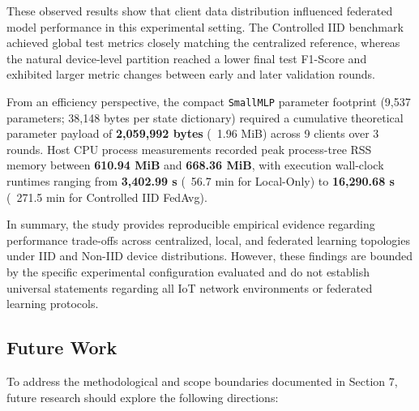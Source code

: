 \documentclass[11pt,a4paper]{article}
\begin{document}
These observed results show that client data distribution influenced federated model performance in this experimental setting. The Controlled IID benchmark achieved global test metrics closely matching the centralized reference, whereas the natural device-level partition reached a lower final test F1-Score and exhibited larger metric changes between early and later validation rounds.

From an efficiency perspective, the compact \texttt{SmallMLP} parameter footprint (9,537 parameters; 38,148 bytes per state dictionary) required a cumulative theoretical parameter payload of \textbf{2,059,992 bytes} (~1.96 MiB) across 9 clients over 3 rounds. Host CPU process measurements recorded peak process-tree RSS memory between \textbf{610.94 MiB} and \textbf{668.36 MiB}, with execution wall-clock runtimes ranging from \textbf{3,402.99 s} (~56.7 min for Local-Only) to \textbf{16,290.68 s} (~271.5 min for Controlled IID FedAvg).

In summary, the study provides reproducible empirical evidence regarding performance trade-offs across centralized, local, and federated learning topologies under IID and Non-IID device distributions. However, these findings are bounded by the specific experimental configuration evaluated and do not establish universal statements regarding all IoT network environments or federated learning protocols.

\subsection{Future Work}
To address the methodological and scope boundaries documented in Section 7, future research should explore the following directions:
\end{document}
